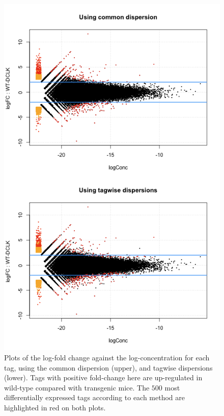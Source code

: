 \begin{figure}[ht]
\begin{center}
\includegraphics[height=0.8\textheight]{edgeR_case_study_longSAGE-030.png}
\caption{Plots of the log-fold change against the log-concentration for each tag, using the common dispersion (upper), and tagwise dispersions (lower). Tags with positive fold-change here are up-regulated in wild-type compared with transgenic mice. The $500$ most differentially expressed tags according to each method are highlighted in red on both plots.}
\label{fig:longSAGE_FC2}
\end{center}
\end{figure}


